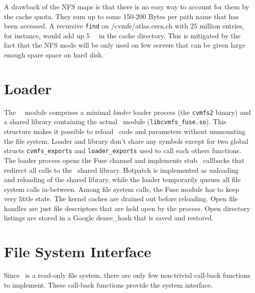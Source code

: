 A drawback of the NFS maps is that there is no easy way to account for them by the cache quota. 
They sum up to some 150-200 Bytes per path name that has been accessed.
A recursive \texttt{find} on /cvmfs/atlas.cern.ch with 25 million entries, for instance, would add up \SI{5}{\giga\byte} in the cache directory.  
This is mitigated by the fact that the NFS mode will be only used on few servers that can be given large enough spare space on hard disk.

\section{Loader}

The \cvmfs\ \fuse\ module comprises a minimal \emph{loader} loader process (the \texttt{cvmfs2} binary) and a shared library containing the actual \fuse\ module (\texttt{libcvmfs\_fuse.so}).
This structure makes it possible to reload \cvmfs\ code and parameters without unmounting the file system.
Loader and library don't share any symbols except for two global structs \texttt{cvmfs\_exports} and \texttt{loader\_exports} used to call each others functions.  
The loader process opens the Fuse channel and implements stub \fuse\ callbacks that redirect all calls to the \cvmfs\ shared library.  
Hotpatch is implemented as unloading and reloading of the shared library, while the loader temporarily queues all file system calls in-between.  
Among file system calls, the Fuse module has to keep very little state.  
The kernel caches are drained out before reloading.  
Open file handles are just file descriptors that are held open by the process. 
Open directory listings are stored in a Google dense\_hash that is saved and restored. 


\section{File System Interface}
\label{sct:interface}

Since \cvmfs\ is a read-only file system, there are only few non-trivial call-back functions to implement.
These call-back functions provide the system interface.

